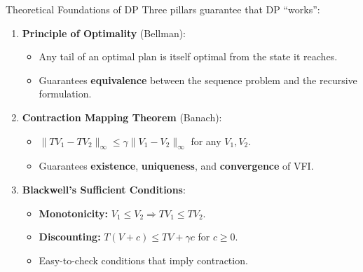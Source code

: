 \documentclass[10pt,english,aspectratio=169]{beamer}
\begin{document}
\begin{frame}{Theoretical Foundations of DP}
Three pillars guarantee that DP ``works'':

\begin{enumerate}
    \item \textbf{Principle of Optimality} (Bellman):
    \begin{itemize}
        \item Any tail of an optimal plan is itself optimal from the state it reaches.
        \item Guarantees \textbf{equivalence} between the sequence problem and the recursive formulation.
    \end{itemize}

    \item \textbf{Contraction Mapping Theorem} (Banach):
    \begin{itemize}
        \item $\|TV_1 - TV_2\|_\infty \leq \gamma \|V_1 - V_2\|_\infty$ for any $V_1, V_2$.
        \item Guarantees \textbf{existence}, \textbf{uniqueness}, and \textbf{convergence} of VFI.
    \end{itemize}

    \item \textbf{Blackwell's Sufficient Conditions}:
    \begin{itemize}
        \item \textbf{Monotonicity:} $V_1 \leq V_2 \Rightarrow TV_1 \leq TV_2$.
        \item \textbf{Discounting:} $T(V+c) \leq TV + \gamma c$ for $c \geq 0$.
        \item Easy-to-check conditions that imply contraction.
    \end{itemize}
\end{enumerate}
\end{frame}
\end{document}
